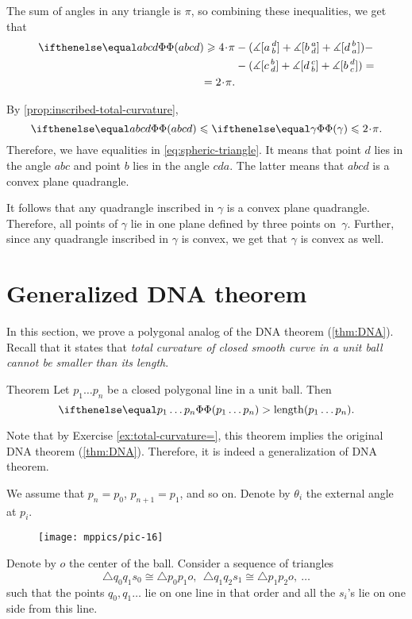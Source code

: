 The sum of angles in any triangle is $\pi$, so combining these inequalities, we get that 
\begin{align*}
\tc{abcd}\ge 4\cdot \pi 
&- (\measuredangle\hinge adb+\measuredangle\hinge bad+ 
\measuredangle\hinge dba)-
\\
&-(\measuredangle\hinge cbd+\measuredangle\hinge dcb 
+\measuredangle\hinge  bdc)=
\\
=2\cdot\pi.&
\end{align*}

By \ref{prop:inscribed-total-curvature},
\[\tc{abcd}\le \tc\gamma\le 2\cdot\pi.\]
Therefore, we have equalities in \ref{eq:spheric-triangle}.
It means that point $d$ lies in the angle $abc$ 
and point $b$ lies in the angle $cda$.
The latter means that $abcd$ is a convex plane quadrangle.

It follows that any quadrangle inscribed in $\gamma$ is a convex plane quadrangle.
Therefore, all points of $\gamma$ lie in one plane defined by three points on~$\gamma$.
Further, since any quadrangle inscribed in $\gamma$ is convex,
we get that $\gamma$ is convex as well. 
\qeds

\section{Generalized DNA theorem}\label{sec:DNA-poly}

In this section, we prove a polygonal analog of the DNA theorem (\ref{thm:DNA}).
Recall that it states that \textit{total curvature of closed smooth curve in a unit ball cannot be smaller than its length}.

\begin{thm}{Theorem}\label{thm:DNA-poly}
Let $p_1\dots p_n$ be a closed polygonal line in a unit ball.
Then 
\[\tc{p_1\dots p_n}>\length(p_1\dots p_n).\]
\end{thm}

Note that by Exercise \ref{ex:total-curvature=}, this theorem implies the original DNA theorem (\ref{thm:DNA}).
Therefore, it is indeed a generalization of DNA theorem.

We assume that $p_n=p_0$, $p_{n+1}=p_1$, and so on.
Denote by $\theta_i$ the external angle at $p_i$.

\begin{figure}[ht!]
\vskip-0mm
\centering
\texttt{[image: mppics/pic-16]}
\vskip0mm
\end{figure}

Denote by $o$ the center of the ball.
Consider a sequence of triangles 
\[\triangle q_0q_1s_0\cong \triangle p_0p_1o,\ \ \triangle q_1q_2s_1\cong \triangle p_1p_2o,\ \dots\]
such that the points $q_0,q_1\dots$ lie on one line in that order and all the $s_i$'s lie on one side from this line.

